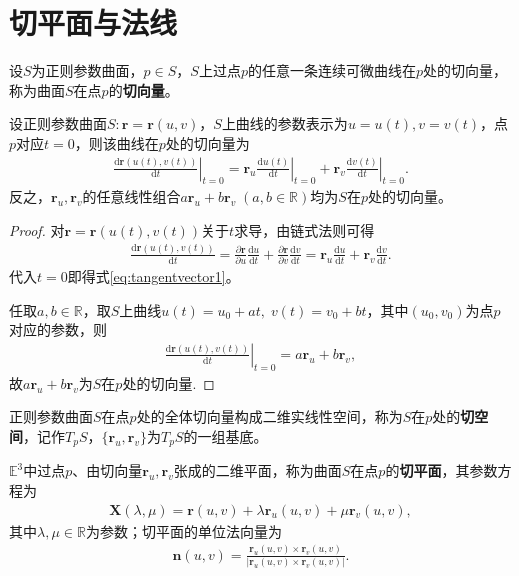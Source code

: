 \documentclass[../../main.tex]{subfiles}%
\begin{document}
\section{切平面与法线}

\begin{definition}
设$S$为正则参数曲面，$p\in S$，$S$上过点$p$的任意一条连续可微曲线在$p$处的切向量，称为曲面$S$在点$p$的\textbf{切向量}。
\end{definition}

\begin{proposition}
设正则参数曲面$S:\bm r=\bm r(u,v)$，$S$上曲线的参数表示为$u=u(t),v=v(t)$，点$p$对应$t=0$，则该曲线在$p$处的切向量为
\begin{align}
\left.\frac{\mathrm{d}\bm r(u(t),v(t))}{\mathrm{d}t}\right|_{t=0}=\left.\bm r_u\frac{\mathrm{d}u(t)}{\mathrm{d}t}\right|_{t=0}+\left.\bm r_v\frac{\mathrm{d}v(t)}{\mathrm{d}t}\right|_{t=0}.
\label{eq:tangentvector1}
\end{align}
反之，$\bm r_u,\bm r_v$的任意线性组合$a\bm r_u+b\bm r_v\;(a,b\in\mathbb{R})$均为$S$在$p$处的切向量。
\end{proposition}

\begin{proof}
对$\bm r=\bm r(u(t),v(t))$关于$t$求导，由链式法则可得
\begin{align*}
\frac{\mathrm{d}\bm r(u(t),v(t))}{\mathrm{d}t}=\frac{\partial\bm r}{\partial u}\frac{\mathrm{d}u}{\mathrm{d}t}+\frac{\partial\bm r}{\partial v}\frac{\mathrm{d}v}{\mathrm{d}t}=\bm r_u\frac{\mathrm{d}u}{\mathrm{d}t}+\bm r_v\frac{\mathrm{d}v}{\mathrm{d}t}.
\end{align*}
代入$t=0$即得式\eqref{eq:tangentvector1}。

任取$a,b\in\mathbb{R}$，取$S$上曲线$u(t)=u_0+at,\;v(t)=v_0+bt$，其中$(u_0,v_0)$为点$p$对应的参数，则
\begin{align*}
\left.\frac{\mathrm{d}\bm r(u(t),v(t))}{\mathrm{d}t}\right|_{t=0}=a\bm r_u+b\bm r_v,
\end{align*}
故$a\bm r_u+b\bm r_v$为$S$在$p$处的切向量.
\end{proof}

\begin{definition}
正则参数曲面$S$在点$p$处的全体切向量构成二维实线性空间，称为$S$在$p$处的\textbf{切空间}，记作$T_pS$，$\{\bm r_u,\bm r_v\}$为$T_pS$的一组基底。
\end{definition}

\begin{definition}
$\mathbb{E}^3$中过点$p$、由切向量$\bm r_u,\bm r_v$张成的二维平面，称为曲面$S$在点$p$的\textbf{切平面}，其参数方程为
\begin{align}
\bm X(\lambda,\mu)=\bm r(u,v)+\lambda\bm r_u(u,v)+\mu\bm r_v(u,v),
\label{eq:tangentplane}
\end{align}
其中$\lambda,\mu\in\mathbb{R}$为参数；切平面的单位法向量为
\begin{align}
\bm n(u,v)=\frac{\bm r_u(u,v)\times\bm r_v(u,v)}{|\bm r_u(u,v)\times\bm r_v(u,v)|}.
\label{eq:unitnormal}
\end{align}
\end{definition}
\end{document}
